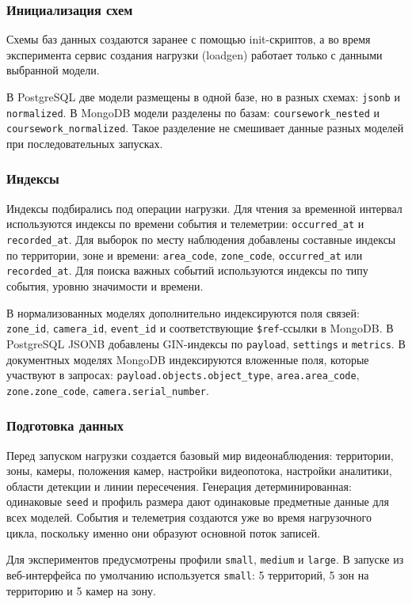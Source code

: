 \subsubsection{Инициализация схем}

Схемы баз данных создаются заранее с помощью init-скриптов, а во время
эксперимента сервис создания нагрузки (loadgen) работает только с данными выбранной модели.

В PostgreSQL две модели размещены в одной базе, но в разных схемах:
\texttt{jsonb} и \texttt{normalized}. В MongoDB модели разделены по базам:
\texttt{coursework\_nested} и \texttt{coursework\_normalized}. Такое
разделение не смешивает данные разных моделей при последовательных запусках.

\subsubsection{Индексы}

Индексы подбирались под операции нагрузки. Для чтения за временной интервал
используются индексы по времени события и телеметрии:
\texttt{occurred\_at} и \texttt{recorded\_at}. Для выборок по месту
наблюдения добавлены составные индексы по территории, зоне и времени:
\texttt{area\_code}, \texttt{zone\_code}, \texttt{occurred\_at} или
\texttt{recorded\_at}. Для поиска важных событий используются индексы по
типу события, уровню значимости и времени.

В нормализованных моделях дополнительно индексируются поля связей:
\texttt{zone\_id}, \texttt{camera\_id}, \texttt{event\_id} и соответствующие
\texttt{\$ref}-ссылки в MongoDB. В PostgreSQL JSONB добавлены GIN-индексы по
\texttt{payload}, \texttt{settings} и \texttt{metrics}. В документных моделях
MongoDB индексируются вложенные поля, которые участвуют в запросах:
\texttt{payload.objects.object\_type}, \texttt{area.area\_code},
\texttt{zone.zone\_code}, \texttt{camera.serial\_number}.

\subsubsection{Подготовка данных}

Перед запуском нагрузки создается базовый мир видеонаблюдения: территории,
зоны, камеры, положения камер, настройки видеопотока, настройки аналитики,
области детекции и линии пересечения. Генерация детерминированная: одинаковые
\texttt{seed} и профиль размера дают одинаковые предметные данные для всех
моделей. События и телеметрия создаются уже во время нагрузочного цикла,
поскольку именно они образуют основной поток записей.

Для экспериментов предусмотрены профили \texttt{small}, \texttt{medium} и
\texttt{large}. В запуске из веб-интерфейса по умолчанию используется
\texttt{small}: 5 территорий, 5 зон на территорию и 5 камер на зону.
